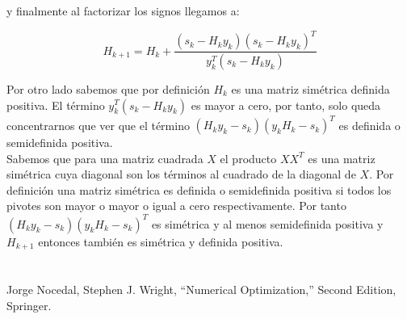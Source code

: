 \documentclass[conference]{IEEEtran}
\begin{document}
y finalmente al factorizar los signos llegamos a:

\begin{equation}
    H_{k+1} = H_k + \frac{(s_k - H_ky_k) (s_k - H_ky_k)^T }{y_k^T (s_k - H_k y_k)}
    \label{eq:e1}
\end{equation}

Por otro lado sabemos que por definición $H_{k}$ es una matriz simétrica definida positiva. El
término $y_k^T (s_k - H_k y_k)$ es mayor a cero, por tanto, solo queda concentrarnos que ver que
el término $(H_ky_k - s_k) (y_k H_k - s_k)^T$ es definida o semidefinida positiva.\\

Sabemos que para una matriz cuadrada $X$ el producto $XX^T$ es una matriz simétrica cuya diagonal
son los términos al cuadrado de la diagonal de $X$. Por definición una matriz simétrica es definida
o semidefinida positiva si todos los pivotes son mayor o mayor o igual a cero respectivamente. Por
tanto $(H_ky_k - s_k) (y_k H_k - s_k)^T$ es simétrica y al menos semidefinida positiva y $H_{k+1}$
entonces también es simétrica y definida positiva.

\section*{}

\begin{thebibliography}{00}
 Jorge Nocedal, Stephen J. Wright, ``Numerical Optimization,'' Second Edition, Springer.
\end{thebibliography}
\end{document}
